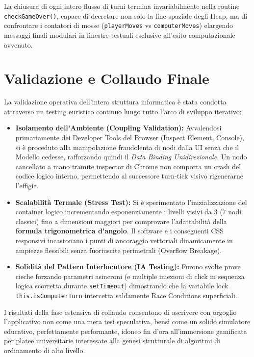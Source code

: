 \documentclass[openany]{theme/uniprthesis}
\begin{document}
La chiusura di ogni intero flusso di turni termina invariabilmente nella routine \texttt{checkGameOver()}, capace di decretare non solo la fine spaziale degli Heap, ma di confrontare i contatori di mosse (\texttt{playerMoves} vs \texttt{computerMoves}) elargendo messaggi finali modulari in finestre testuali esclusive all'esito computazionale avvenuto.

\section{Validazione e Collaudo Finale}
La validazione operativa dell'intera struttura informatica è stata condotta attraverso un testing euristico continuo lungo tutto l'arco di sviluppo iterativo:
\begin{itemize}
    \item \textbf{Isolamento dell'Ambiente (Coupling Validation):} Avvalendosi primariamente dei Developer Tools del Browser (Inspect Element, Console), si è proceduto alla manipolazione fraudolenta di nodi dalla UI senza che il Modello cedesse, rafforzando quindi il \textit{Data Binding Unidirezionale}. Un nodo cancellato a mano tramite inspector di Chrome non comporta un crash del codice logico interno, permettendo al successore turn-tick visivo rigenerarne l'effigie.
    \item \textbf{Scalabilità Termale (Stress Test):} Si è sperimentato l'inizializzazione del container logico incrementando esponenziamente i livelli visivi da 3 (7 nodi classici) fino a dimensioni maggiori per comprovare l'adattabilità della \textbf{formula trigonometrica d'angolo}. Il software e i conseguenti CSS responsivi incastonano i punti di ancoraggio vettoriali dinamicamente in ampiezze flessibili senza fuoriuscite perimetrali (Overflow Breakage).
    \item \textbf{Solidità del Pattern Interlocutore (IA Testing):} Furono svolte prove cieche forzando parametri asincroni (e multiple iniezioni di click in sequenza logica scorretta durante \texttt{setTimeout}) dimostrando che la variabile lock \texttt{this.isComputerTurn} intercetta saldamente Race Conditions superficiali. 
\end{itemize}

I risultati della fase estensiva di collaudo consentono di ascrivere con orgoglio l'applicativo non come una mera tesi speculativa, bensì come un solido simulatore educativo, perfettamente performante, idoneo fin d'ora all'immersione gamificata per platee universitarie interessate alla genesi strutturale di algoritmi di ordinamento di alto livello.
\end{document}

